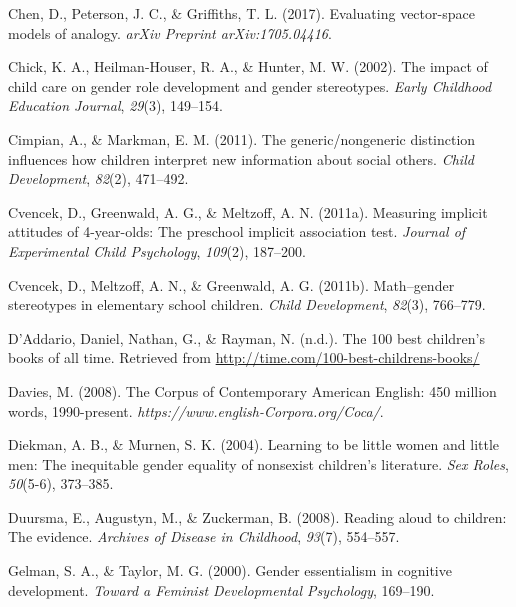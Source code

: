 \documentclass[
  english,
  ,man,floatsintext]{apa6}
\begin{document}
\leavevmode\hypertarget{ref-chen2017evaluating}{}%
Chen, D., Peterson, J. C., \& Griffiths, T. L. (2017). Evaluating vector-space models of analogy. \emph{arXiv Preprint arXiv:1705.04416}.

\leavevmode\hypertarget{ref-chick2002impact}{}%
Chick, K. A., Heilman-Houser, R. A., \& Hunter, M. W. (2002). The impact of child care on gender role development and gender stereotypes. \emph{Early Childhood Education Journal}, \emph{29}(3), 149--154.

\leavevmode\hypertarget{ref-cimpian2011generic}{}%
Cimpian, A., \& Markman, E. M. (2011). The generic/nongeneric distinction influences how children interpret new information about social others. \emph{Child Development}, \emph{82}(2), 471--492.

\leavevmode\hypertarget{ref-cvencek2011measuring}{}%
Cvencek, D., Greenwald, A. G., \& Meltzoff, A. N. (2011a). Measuring implicit attitudes of 4-year-olds: The preschool implicit association test. \emph{Journal of Experimental Child Psychology}, \emph{109}(2), 187--200.

\leavevmode\hypertarget{ref-cvencek2011math}{}%
Cvencek, D., Meltzoff, A. N., \& Greenwald, A. G. (2011b). Math--gender stereotypes in elementary school children. \emph{Child Development}, \emph{82}(3), 766--779.

\leavevmode\hypertarget{ref-time_100_kidbooks}{}%
D'Addario, Daniel, Nathan, G., \& Rayman, N. (n.d.). The 100 best children's books of all time. Retrieved from \url{http://time.com/100-best-childrens-books/}

\leavevmode\hypertarget{ref-davies2008corpus}{}%
Davies, M. (2008). The Corpus of Contemporary American English: 450 million words, 1990-present. \emph{https://www.english-Corpora.org/Coca/}.

\leavevmode\hypertarget{ref-diekman2004learning}{}%
Diekman, A. B., \& Murnen, S. K. (2004). Learning to be little women and little men: The inequitable gender equality of nonsexist children's literature. \emph{Sex Roles}, \emph{50}(5-6), 373--385.

\leavevmode\hypertarget{ref-duursma2008reading}{}%
Duursma, E., Augustyn, M., \& Zuckerman, B. (2008). Reading aloud to children: The evidence. \emph{Archives of Disease in Childhood}, \emph{93}(7), 554--557.

\leavevmode\hypertarget{ref-gelman2000gender}{}%
Gelman, S. A., \& Taylor, M. G. (2000). Gender essentialism in cognitive development. \emph{Toward a Feminist Developmental Psychology}, 169--190.
\end{document}
